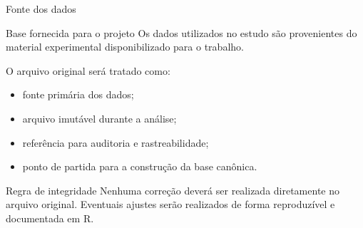 %
%
%
%
%



\begin{frame}{Fonte dos dados}

    \begin{block}{Base fornecida para o projeto}
        Os dados utilizados no estudo são provenientes do material
        experimental disponibilizado para o trabalho.
    \end{block}

    \vspace{0.3cm}

    O arquivo original será tratado como:

    \begin{itemize}
        \item fonte primária dos dados;
        \item arquivo imutável durante a análise;
        \item referência para auditoria e rastreabilidade;
        \item ponto de partida para a construção da base canônica.
    \end{itemize}

    \vspace{0.3cm}

    \begin{alertblock}{Regra de integridade}
        Nenhuma correção deverá ser realizada diretamente no arquivo
        original. Eventuais ajustes serão realizados de forma
        reproduzível e documentada em R.
    \end{alertblock}

\end{frame}



